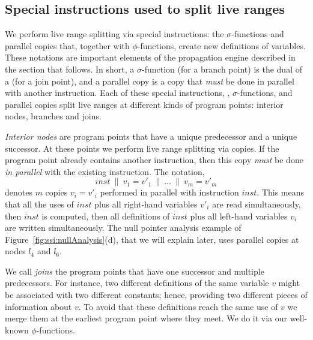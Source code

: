 \subsection{Special instructions used to split live ranges}
\label{sub:ssi:split}

We perform live range splitting via special instructions: the $\sigma$-functions and parallel copies that, together with $\phi$-functions, create new definitions of variables.
These notations are important elements of the propagation engine described in the section that follows.
In short, a $\sigma$-function (for a branch point) is the dual of a \phiop (for a join point), and a parallel copy is a copy that \emph{must} be done in parallel with another instruction.
Each of these special instructions, \phiop, $\sigma$-functions, and parallel copies split live ranges at different kinds of program points: interior nodes, branches and joins.

{\em Interior nodes} are program points that have a unique predecessor and a unique successor.
At these points we perform live range splitting via copies.
If the program point already contains another instruction, then this copy \emph{must} be done \emph{in parallel} with the existing instruction.
The notation, \[inst \ \parallel\  v_1=v'_1 \ \parallel\  \dots \ \parallel\  v_m=v'_m\] denotes $m$ copies $v_i=v'_i$ performed in parallel with
instruction $inst$.
This means that all the uses of $inst$ plus all right-hand variables $v'_i$ are read simultaneously, then $inst$ is computed, then all definitions of $inst$ plus all left-hand variables $v_i$ are written simultaneously.
The null pointer analysis example of Figure~\ref{fig:ssi:nullAnalysis}(d), that we will explain later, uses parallel copies at nodes $l_4$ and $l_6$.


We call {\em joins} the program points that have one successor and multiple predecessors.
For instance, two different definitions of the same variable $v$ might be associated with two different constants; hence, providing two different pieces of information about $v$.
To avoid that these definitions reach the same use of $v$ we merge them at the earliest program point where they meet.
We do it via our well-known $\phi$-functions.

